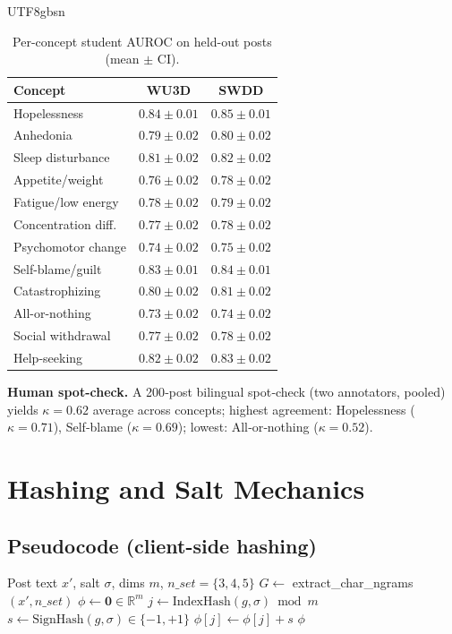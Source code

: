 \documentclass[acmsmall,natbib]{acmart}
\begin{document}
\begin{CJK*}{UTF8}{gbsn}
\begin{table}[h]
\centering
\caption{Per-concept student AUROC on held-out posts (mean $\pm$ CI).}
\label{tab:concept-auroc}
\setlength{\tabcolsep}{4.8pt}
\begin{tabular}{lcc}
\toprule
\textbf{Concept} & \textbf{WU3D} & \textbf{SWDD} \\
\midrule
Hopelessness & $0.84{\pm}0.01$ & $0.85{\pm}0.01$ \\
Anhedonia & $0.79{\pm}0.02$ & $0.80{\pm}0.02$ \\
Sleep disturbance & $0.81{\pm}0.02$ & $0.82{\pm}0.02$ \\
Appetite/weight & $0.76{\pm}0.02$ & $0.78{\pm}0.02$ \\
Fatigue/low energy & $0.78{\pm}0.02$ & $0.79{\pm}0.02$ \\
Concentration diff. & $0.77{\pm}0.02$ & $0.78{\pm}0.02$ \\
Psychomotor change & $0.74{\pm}0.02$ & $0.75{\pm}0.02$ \\
Self-blame/guilt & $0.83{\pm}0.01$ & $0.84{\pm}0.01$ \\
Catastrophizing & $0.80{\pm}0.02$ & $0.81{\pm}0.02$ \\
All-or-nothing & $0.73{\pm}0.02$ & $0.74{\pm}0.02$ \\
Social withdrawal & $0.77{\pm}0.02$ & $0.78{\pm}0.02$ \\
Help-seeking & $0.82{\pm}0.02$ & $0.83{\pm}0.02$ \\
\bottomrule
\end{tabular}
\end{table}

\noindent\textbf{Human spot-check.} A 200‑post bilingual spot‑check (two annotators, pooled) yields $\kappa{=}0.62$ average across concepts; highest agreement: Hopelessness ($\kappa{=}0.71$), Self‑blame ($\kappa{=}0.69$); lowest: All‑or‑nothing ($\kappa{=}0.52$).


\section{Hashing and Salt Mechanics}
\label{app:hashing}

\subsection{Pseudocode (client-side hashing)}
\begin{algorithm}[h]
\caption{Salted signed feature hashing for char $n$-grams}
\label{alg:hash}
\begin{algorithmic}[1]
\Require Post text $x'$, salt $\sigma$, dims $m$, $n\_set=\{3,4,5\}$
\State $G \gets$ extract\_char\_ngrams$(x', n\_set)$
\State $\phi \gets \mathbf{0} \in \mathbb{R}^{m}$
  \State $j \gets \text{IndexHash}(g, \sigma) \bmod m$
  \State $s \gets \text{SignHash}(g, \sigma) \in \{-1,+1\}$
  \State $\phi[j] \gets \phi[j] + s$
\EndFor
\State \Return $\phi$
\end{algorithmic}
\end{algorithm}


\end{CJK*}
\end{document}
